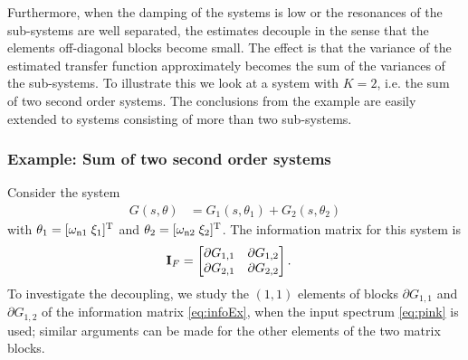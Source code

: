 Furthermore, when the damping of the systems is low or the resonances of the sub-systems are well separated, the estimates decouple in the sense that the elements off-diagonal blocks become small.
The effect is that the variance of the estimated transfer function approximately becomes the sum of the variances of the sub-systems.
To illustrate this we look at a system with $K=2$, i.e. the sum of two second order systems.
The conclusions from the example are easily extended to systems consisting of more than two sub-systems.

\subsubsection{Example: Sum of two second order systems}
Consider the system
\begin{align}
G(s,\theta) &= G_1(s,\theta_1) + G_2(s,\theta_2)%
\end{align}
with $\theta_1=[\wn[1]\;\damping_1]^{\T}$ and $\theta_2=[\wn[2]\;\damping_2]^{\T}$.
The information matrix for this system is
\begin{align}
\IF &=
       \begin{bmatrix}
         \partial G_{1,1}  & \partial G_{1,2}\\
         \partial G_{2,1}  & \partial G_{2,2}
       \end{bmatrix}.
\label{eq:infoEx}
\end{align}
To investigate the decoupling, we study the $(1,1)$ elements of blocks $\partial G_{1,1}$ and $\partial G_{1,2}$ of the information matrix \eqref{eq:infoEx}, when the input spectrum \eqref{eq:pink} is used; similar arguments can be made for the other elements of the two matrix blocks.

